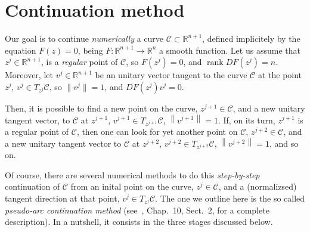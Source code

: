 \documentclass[11pt,reqno,twoside]{article}
\newcommand{\R}{\ensuremath{\mathbb{R}}}
\theoremstyle{remark}
\begin{document}
\title{}
\author{}
\date{}

\section{Continuation method}\label{sec:pseudoArc} Our goal is to continue
\emph{numerically} a curve $\mathcal{C}\subset\R^{n+1}$, defined
implicitely by the equation
       $F(z) = 0$,
being $F:\R^{n+1}\longrightarrow \R^{n}$ a smooth function. Let us assume
that $z^{j}\in\R^{n+1}$, is a \emph{regular} point of $\mathcal{C}$, so
$F\left(z^{j}\right) = 0$, and
  $\mathop{rank}DF\left(z^{j}\right) = n$.
Moreover, let $v^{j}\in\R^{n+1}$ be an unitary vector tangent to the curve
$\mathcal{C}$ at the point $z^{j}$, $v^{j}\in T_{z^{j}}\mathcal{C}$, so
  $\| v^{j}\| = 1$, and
  $DF\left(z^{j}\right) v^{j} = 0$.

Then, it is possible to find a new point on the curve,
$z^{j+1}\in\mathcal{C}$, and a new unitary tangent vector, to
$\mathcal{C}$ at $z^{j+1}$, $v^{j+1}\in T_{z^{j+1}}\mathcal{C}$,
$\left\|v^{j+1}\right\| = 1$. If, on its turn, $z^{j+1}$ is a regular point
of $\mathcal{C}$, then  one can look for yet another point on
$\mathcal{C}$, $z^{j+2}\in\mathcal{C}$, and a new unitary tangent vector to
$\mathcal{C}$ at $z^{j+2}$, $v^{j+2}\in T_{z^{j+2}}\mathcal{C}$,
$\left\|v^{j+2}\right\| = 1$, and so on.

Of course, there are several numerical methods to do this
\emph{step-by-step} continuation of $\mathcal{C}$ from an inital point on
the curve, $z^{j}\in\mathcal{C}$, and a (normalizsed) tangent direction at
that point, $v^{j}\in T_{z^{j}}\mathcal{C}$. The one we outline here is the so
called \emph{pseudo-arc continuation method} (see~\cite{Kuznetsov2004},
Chap.~10, Sect.~2, for a complete description). In a nutshell, it consists
in the three stages discussed below.
\end{document}
